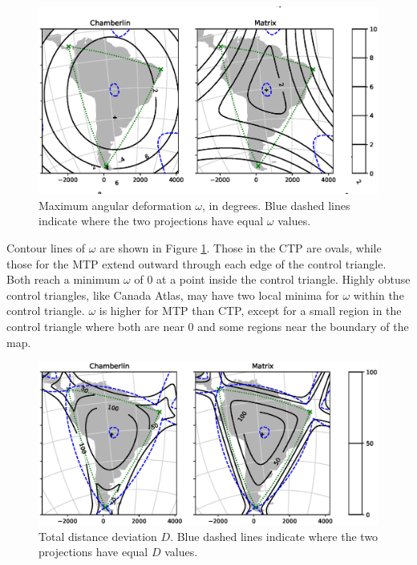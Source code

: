 \documentclass[]{interact}
\begin{document}
\begin{figure}
  \includegraphics[width=\textwidth]{South_America_Wall_Map_omega}
  \caption{Maximum angular deformation $\omega$, in degrees. Blue dashed lines
  indicate where the two projections have equal $\omega$ values.}
  \label{fig:angle}
\end{figure}

Contour lines of $\omega$ are shown in Figure \ref{fig:angle}. Those in the CTP
are ovals, while those for the MTP extend outward through each edge of the
control triangle. Both reach a minimum $\omega$ of 0 at a point inside the
control triangle. Highly obtuse control triangles, like Canada Atlas, may have
two local minima for $\omega$ within the control triangle. $\omega$ is higher
for MTP than CTP, except for a small region in the control triangle where both
are near 0 and some regions near the boundary of the map.

\begin{figure}
  \includegraphics[width=\textwidth]{South_America_Wall_Map_distance}
  \caption{Total distance deviation $D$. Blue dashed lines
  indicate where the two projections have equal $D$ values.}
  \label{fig:distance}
\end{figure}
\end{document}

